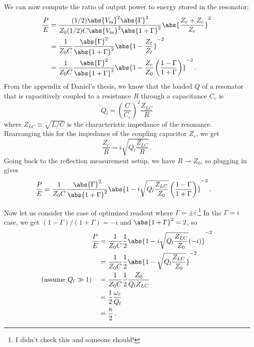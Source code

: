 We can now compute the ratio of output power to energy stored in the resonator:
\begin{align}
  \frac{P}{E}
    &= \frac{(1/2) \abs{V_\text{in}}^2 \abs{\Gamma}^2}
            {Z_0 (1/2) C \abs{V_\text{in}}^2 \abs{1 + \Gamma}^2}
       \abs{\frac{Z_r + Z_c}{Z_r}}^2 \\
    &= \frac{1}{Z_0 C} \frac{\abs{\Gamma}^2}{\abs{1 + \Gamma}^2}
       \abs{1 - \frac{Z_c}{Z_l}}^{-2} \\
    &= \frac{1}{Z_0 C} \frac{\abs{\Gamma}^2}{\abs{1 + \Gamma}^2}
       \abs{1 - \frac{Z_c}{Z_0} \left( \frac{1-\Gamma}{1+\Gamma} \right)}^{-2} \, .
\end{align}
From the appendix of Daniel's thesis, we know that the loaded $Q$ of a resonator that is capacitively coupled to a resistance $R$ through a capacitance $C_c$ is
\begin{equation}
  Q_l = \left( \frac{C}{C_c} \right)^2 \frac{Z_{LC}}{R}
\end{equation}
where $Z_{LC} \equiv \sqrt{L/C}$ is the characteristic impedance of the resonance.
Rearranging this for the impedance of the coupling capacitor $Z_c$, we get
\begin{equation}
  \frac{Z_c}{R} = i \sqrt{Q_l \frac{Z_{LC}}{R}} \, .
\end{equation}
Going back to the reflection measurement setup, we have $R \to Z_0$, so plugging in gives
\begin{align}
  \frac{P}{E}
    &= \frac{1}{Z_0 C} \frac{\abs{\Gamma}^2}{\abs{1 + \Gamma}^2}
       \abs{1 - i \sqrt{Q_l \frac{Z_{LC}}{Z_0}}
       \left( \frac{1-\Gamma}{1+\Gamma} \right)}^{-2} \, .
\end{align}

Now let us consider the case of optimized readout where $\Gamma = \pm i$.\footnote{I didn't check this and someone should!}
In the $\Gamma = i$ case, we get $(1-\Gamma)/(1+\Gamma)=-i$ and $\abs{1+\Gamma}^2=2$, so
\begin{align}
  \frac{P}{E}
  &= \frac{1}{Z_0 C} \frac{1}{2} \abs{1 - i \sqrt{Q_l \frac{Z_{LC}}{Z_0}} (-i)}^{-2} \\
  &= \frac{1}{Z_0 C} \frac{1}{2} \abs{1 - \sqrt{Q_l \frac{Z_{LC}}{Z_0}}}^{-2} \\
  (\text{assume } Q_l \gg 1) \quad &= \frac{1}{Z_0 C} \frac{1}{2} \frac{Z_0}{Q_l Z_{LC}} \\
  &= \frac{1}{2} \frac{\omega_r}{Q_l} \\
  &= \frac{\kappa}{2} \, .
\end{align}

